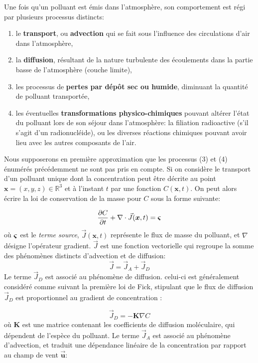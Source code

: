 	Une fois qu'un polluant est émis dans l'atmosphère, son comportement est régi par plusieurs processus distincts:\\
	\begin{enumerate}
		\item le \textbf{transport}, ou \textbf{advection} qui se fait sous l'influence des circulations d'air dans l'atmosphère,
		\item la \textbf{diffusion}, résultant de la nature turbulente des écoulements dans la partie basse de l'atmosphère (couche limite),
		\item les processus de \textbf{pertes par dépôt sec ou humide}, diminuant la quantité de polluant transportée,
		\item les éventuelles \textbf{transformations physico-chimiques} pouvant altérer l'état du polluant lors de son séjour dans l'atmosphère: la filiation radioactive (s'il s'agit d'un radionucléide), ou les diverses réactions chimiques pouvant avoir lieu avec les autres composants de l'air.\\
	\end{enumerate}
	
	Nous supposerons en première approximation que les processus (3) et (4) énumérés précédemment ne sont pas pris en compte. Si on considère le transport d'un polluant unique dont la concentration peut être décrite au point $\bm{x} = (x,y,z) \in \mathbb{R}^3$ et à l'instant $t$ par une fonction $C(\bm{x},t)$. On peut alors écrire la loi de conservation de la masse pour $C$ sous la forme suivante:
	
	\begin{equation}
	\label{eqn_conservation_masse}
		\dfrac{\partial C}{\partial t} + \nabla \cdot \vec{J}(\bm{x},t) = {\bm{\varsigma}}
	\end{equation}
	où ${\bm{\varsigma}}$ est le \textit{terme source}, $\vec{J}(\bm{x},t)$ représente le flux de masse du polluant, et $\nabla$ désigne l'opérateur gradient. $\vec{J}$ est une fonction vectorielle qui regroupe la somme des phénomènes distincts d'advection et de diffusion: 
	\begin{equation}
	\label{eqn_somme_flux}
	\vec{J} = \vec{J}_A + \vec{J}_D
	\end{equation}
	Le terme $\vec{J}_D$ est associé au phénomène de diffusion. celui-ci est généralement considéré comme suivant la première loi de Fick, stipulant que le flux de diffusion $\vec{J}_D$ est proportionnel au gradient de concentration : 
	
	\begin{equation}
	\label{eqn_fick_diffusion}
	\vec{J}_D = - \bm{K}\nabla C
	\end{equation}
	où $\bm{K}$ est une matrice contenant les coefficients de diffusion moléculaire, qui dépendent de l'espèce du polluant. Le terme $\vec{J}_A$ est associé au phénomène d'advection, et traduit une dépendance linéaire de la concentration par rapport au champ de vent $\bm{\vec{u}}$:
	
